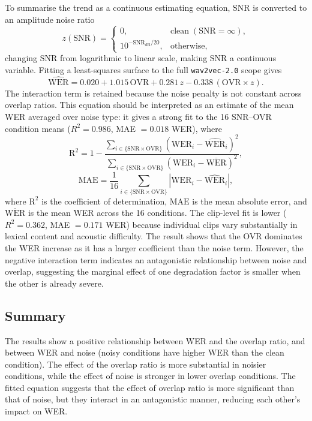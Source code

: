 To summarise the trend as a continuous estimating equation, SNR is converted to an amplitude noise ratio
\begin{equation}
    z(\mathrm{SNR}) =
    \begin{cases}
        0, & \mathrm{clean}\;(\mathrm{SNR}=\infty),\\
        10^{-\mathrm{SNR}_{\mathrm{dB}}/20}, & \text{otherwise},
    \end{cases}
\end{equation} 
changing SNR from logarithmic to linear scale, making SNR a continuous variable. Fitting a least-squares surface to the full \texttt{wav2vec-2.0} scope gives
\begin{equation}
    \widehat{\mathrm{WER}} =
    0.020 + 1.015\,\mathrm{OVR} + 0.281\,z - 0.338\,(\mathrm{OVR}\times z).
\end{equation}
The interaction term is retained because the noise penalty is not constant across overlap ratios. This equation should be interpreted as an estimate of the mean WER averaged over noise type: it gives a strong fit to the 16 SNR--OVR condition means ($R^2=0.986$, MAE $=0.018$ WER), where
\begin{equation}
    \mathrm{R}^2 = 1 - \frac{\sum_{i \in \mathrm{\{\mathrm{SNR} \times \mathrm{OVR}\}}}(\mathrm{WER}_i - \widehat{\mathrm{WER}}_i)^2}{\sum_{i \in \mathrm{\{\mathrm{SNR} \times \mathrm{OVR}\}}}(\mathrm{WER}_i - \overline{\mathrm{WER}})^2},
\end{equation}
\begin{equation}
    \mathrm{MAE} = \frac{1}{16}\sum_{i \in \mathrm{\{\mathrm{SNR} \times \mathrm{OVR}\}}}|\mathrm{WER}_i - \widehat{\mathrm{WER}}_i|,
\end{equation}
where $\mathrm{R}^2$ is the coefficient of determination, $\mathrm{MAE}$ is the mean absolute error, and $\overline{\mathrm{WER}}$ is the mean WER across the 16 conditions. 
The clip-level fit is lower ($R^2=0.362$, MAE $=0.171$ WER) because individual clips vary substantially in lexical content and acoustic difficulty. The result shows that the OVR dominates the WER increase as it has a larger coefficient than the noise term. However, the negative interaction term indicates an antagonistic relationship between noise and overlap, suggesting the marginal effect of one degradation factor is smaller when the other is already severe.

\subsection{Summary}
The results show a positive relationship between WER and the overlap ratio, and between WER and noise (noisy conditions have higher WER than the clean condition). The effect of the overlap ratio is more substantial in noisier conditions, while the effect of noise is stronger in lower overlap conditions. The fitted equation suggests that the effect of overlap ratio is more significant than that of noise, but they interact in an antagonistic manner, reducing each other's impact on WER.



